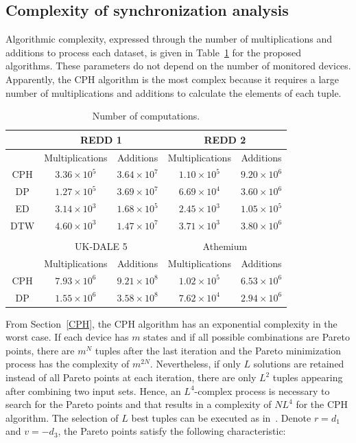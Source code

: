 \subsection{Complexity of synchronization analysis}
Algorithmic complexity, expressed through the number of multiplications and additions to process each dataset, is given in Table~\ref{table:SR13} for the proposed algorithms. These parameters do not depend on the number of monitored devices. Apparently, the CPH algorithm is the most complex because it requires a large number of multiplications and additions to calculate the elements of each tuple. 
\begin{table}
\caption{Number of computations.}\label{table:SR13}
\begin{center}
\begin{tabular}{|c|c|c|c|c|}
\hline
 & \multicolumn{2}{c|}{REDD 1}&\multicolumn{2}{c|}{REDD 2}\\
\hline
 & Multiplications & Additions&Multiplications & Additions\\
 \hline
 CPH & $3.36\times 10^5$ & $3.64\times 10^7$& $1.10\times 10^5$&$9.20\times 10^6$\\
 \hline
 DP & $1.27\times 10^5 $&$3.69\times 10^7$&$6.69\times 10^4$ & $3.60\times 10^6$\\
 \hline
 ED& $3.14\times 10^3$ & $1.68\times 10^5$& $2.45 \times 10^3$&$1.05 \times 10^5$\\
 \hline
 DTW  & $4.60\times 10^3$ & $1.47\times 10^7$&$3.71\times 10^3$&$3.80\times 10^6$\\
 \hline
 \multicolumn{5}{|c|}{ }\\
 \hline
  &\multicolumn{2}{c|}{UK-DALE 5}& \multicolumn{2}{c|}{Athemium}\\
\hline
 & Multiplications & Additions&Multiplications & Additions\\
 \hline
 CPH & $7.93\times 10^6$ & $9.21\times 10^8$ & $1.02\times 10^5$ & $6.53\times 10^6$  \\
 \hline
 DP  & $1.55\times 10^6$& $3.58\times 10^8$ & $7.62\times 10^4$ & $2.94\times 10^6$  \\
 \hline
\end{tabular}
\end{center}
\end{table}
From Section~\ref{CPH}, the CPH algorithm has an exponential complexity in the worst case. If each device has $m$ states and if all possible combinations are Pareto points, there are $m^N$ tuples after the last iteration and the Pareto minimization process has the complexity of $m^{2N}$. Nevertheless, if only $L$ solutions are retained instead of all Pareto points at each iteration, there are only $L^2$ tuples appearing after combining two input sets. Hence, an $L^4$-complex process is necessary to search for the Pareto points and that results in a complexity of $NL^4$ for the CPH algorithm. The selection of $L$ best tuples can be executed as in~\cite{Shojaei13}. Denote $r = d_1$ and $v = -d_3$, the Pareto points satisfy the following characteristic:
